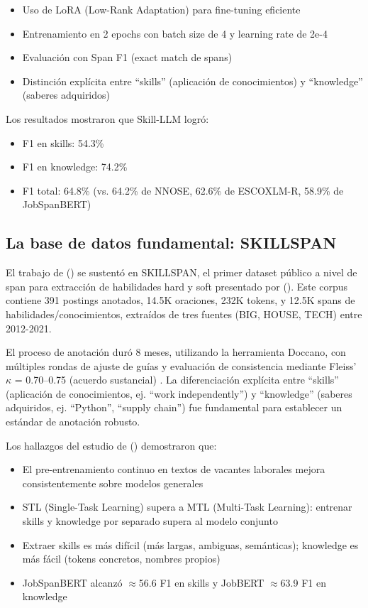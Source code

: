 \begin{itemize}
    \item Uso de LoRA (Low-Rank Adaptation) para fine-tuning eficiente
    \item Entrenamiento en 2 epochs con batch size de 4 y learning rate de 2e-4
    \item Evaluación con Span F1 (exact match de spans)
    \item Distinción explícita entre ``skills'' (aplicación de conocimientos) y ``knowledge'' (saberes adquiridos)
\end{itemize}

Los resultados mostraron que Skill-LLM logró:

\begin{itemize}
    \item F1 en skills: 54.3\%
    \item F1 en knowledge: 74.2\%
    \item F1 total: 64.8\% (vs. 64.2\% de NNOSE, 62.6\% de ESCOXLM-R, 58.9\% de JobSpanBERT) \parencite{herandi2024}
\end{itemize}

\subsection{La base de datos fundamental: SKILLSPAN}

El trabajo de \citeauthor{herandi2024} (\citeyear{herandi2024}) se sustentó en SKILLSPAN, el primer dataset público a nivel de span para extracción de habilidades hard y soft presentado por \citeauthor{zhang2022} (\citeyear{zhang2022}). Este corpus contiene 391 postings anotados, 14.5K oraciones, 232K tokens, y 12.5K spans de habilidades/conocimientos, extraídos de tres fuentes (BIG, HOUSE, TECH) entre 2012-2021.

El proceso de anotación duró 8 meses, utilizando la herramienta Doccano, con múltiples rondas de ajuste de guías y evaluación de consistencia mediante Fleiss' $\kappa$ = 0.70–0.75 (acuerdo sustancial) \parencite{zhang2022}. La diferenciación explícita entre ``skills'' (aplicación de conocimientos, ej. ``work independently'') y ``knowledge'' (saberes adquiridos, ej. ``Python'', ``supply chain'') fue fundamental para establecer un estándar de anotación robusto.

Los hallazgos del estudio de \citeauthor{zhang2022} (\citeyear{zhang2022}) demostraron que:

\begin{itemize}
    \item El pre-entrenamiento continuo en textos de vacantes laborales mejora consistentemente sobre modelos generales
    \item STL (Single-Task Learning) supera a MTL (Multi-Task Learning): entrenar skills y knowledge por separado supera al modelo conjunto
    \item Extraer skills es más difícil (más largas, ambiguas, semánticas); knowledge es más fácil (tokens concretos, nombres propios)
    \item JobSpanBERT alcanzó $\approx$56.6 F1 en skills y JobBERT $\approx$63.9 F1 en knowledge \parencite{zhang2022}
\end{itemize}

